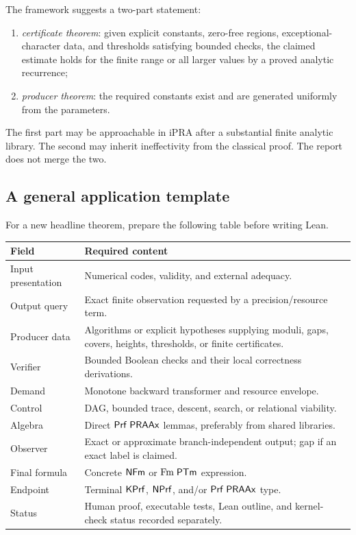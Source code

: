 The framework suggests a two-part statement:

\begin{enumerate}
\item \emph{certificate theorem}: given explicit constants, zero-free regions,
exceptional-character data, and thresholds satisfying bounded checks, the
claimed estimate holds for the finite range or all larger values by a proved
analytic recurrence;
\item \emph{producer theorem}: the required constants exist and are generated
uniformly from the parameters.
\end{enumerate}

The first part may be approachable in iPRA after a substantial finite analytic
library.  The second may inherit ineffectivity from the classical proof.  The
report does not merge the two.

\subsection{A general application template}

For a new headline theorem, prepare the following table before writing Lean.

\begin{longtable}{L{0.22\textwidth}L{0.69\textwidth}}
\toprule
Field & Required content \\
\midrule
Input presentation & Numerical codes, validity, and external adequacy.\\
Output query & Exact finite observation requested by a precision/resource term.\\
Producer data & Algorithms or explicit hypotheses supplying moduli, gaps, covers, heights, thresholds, or finite certificates.\\
Verifier & Bounded Boolean checks and their local correctness derivations.\\
Demand & Monotone backward transformer and resource envelope.\\
Control & DAG, bounded trace, descent, search, or relational viability.\\
Algebra & Direct \(\mathsf{Prf}\;\mathsf{PRAAx}\) lemmas, preferably from shared libraries.\\
Observer & Exact or approximate branch-independent output; gap if an exact label is claimed.\\
Final formula & Concrete \(\mathsf{NFm}\) or \(\mathrm{Fm}\;\mathsf{PTm}\) expression.\\
Endpoint & Terminal \(\mathsf{KPrf}\), \(\mathsf{NPrf}\), and/or \(\mathsf{Prf}\;\mathsf{PRAAx}\) type.\\
Status & Human proof, executable tests, Lean outline, and kernel-check status recorded separately.\\
\bottomrule
\end{longtable}
